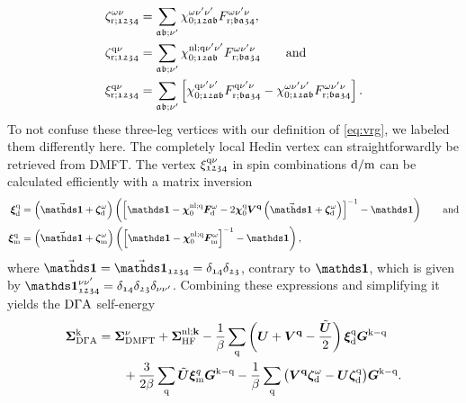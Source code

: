 \documentclass[../../main.tex]{subfiles}
\begin{document}
\begin{align}\label{eq:three_leg_vertices_abinitio_dga}
	\zeta_{\text{r};\mathfrak{1234}}^{\omega\nu}&=\sum_{\mathfrak{ab;\nu'}}\chi_{0;\mathfrak{12ab}}^{\omega\nu'\nu'}F_{\text{r};\mathfrak{ba34}}^{\omega\nu'\nu},\\
	\zeta_{\text{r};\mathfrak{1234}}^{\text{q}\nu}&=\sum_{\mathfrak{ab;\nu'}}\chi_{0;\mathfrak{12ab}}^{\text{nl};\text{q}\nu'\nu'}F_{\text{r};\mathfrak{ba34}}^{\omega\nu'\nu}\qquad\text{and}\\
	\xi_{\text{r};\mathfrak{1234}}^{\text{q}\nu}&=\sum_{\mathfrak{ab;\nu'}}\left [\chi_{0;\mathfrak{12ab}}^{\text{q}\nu'\nu'}F_{\text{r};\mathfrak{ba34}}^{\text{q}\nu'\nu}-\chi_{0;\mathfrak{12ab}}^{\omega\nu'\nu'}F_{\text{r};\mathfrak{ba34}}^{\omega\nu'\nu}\right ].
\end{align}
To not confuse these three-leg vertices with our definition of \eqref{eq:vrg}, we labeled them differently here. The completely local Hedin vertex can straightforwardly be retrieved from DMFT. The vertex $\xi_{\mathfrak{1234}}^{\text{q}\nu}$ in spin combinations $\text{d}/\text{m}$ can be calculated efficiently with a matrix inversion
\begin{subequations}
\begin{align}
	\bm\xi_{\dens}^{\q}&=\left (\vec{\bm\unity}+\bm\zeta_{\dens}^{\omega}\right )\left (\left [\bm\unity-\bm\chi_{0}^{\nl;\q}\bm F_{\dens}^{\omega}-2\bm\chi_{0}^{\q}\bm V^{\vv{q}}\left (\vec{\bm\unity}+\bm\zeta_{\dens}^{\omega}\right )\right ]^{-1}-\bm\unity\right )\qqand\\
	\bm\xi_{\magn}^{\q}&=\left (\vec{\bm\unity}+\bm\zeta_{\magn}^{\omega}\right )\left (\left [\bm\unity-\bm\chi_{0}^{\nl;\q}\bm F_{\magn}^{\omega}\right ]^{-1}-\bm\unity\right ),
\end{align}
\end{subequations}
where $\vec{\bm\unity}=\vec{\bm\unity}_{\mathfrak{1234}}=\delta_{\mathfrak{14}}\delta_{\mathfrak{23}}$, contrary to $\bm\unity$, which is given by $\bm\unity_{\mathfrak{1234}}^{\nu\nu'}=\delta_{\mathfrak{14}}\delta_{\mathfrak{23}}\delta_{\nu\nu'}$. Combining these expressions and simplifying it \cite{Galler2017} yields the $\text{D}\Gamma\text{A}$ self-energy
\begin{align}\label{eq:sde_abinitio_dga}
\begin{split}
	\bm\Sigma_{\text{D}\Gamma\text{A}}^{\text{k}}&=\bm\Sigma_{\text{DMFT}}^{\nu}+\bm\Sigma_{\text{HF}}^{\text{nl};\textbf{k}}-\frac1\beta\sum_{\text{q}}\left (\bm U + \bm V^{\textbf{q}}-\frac{\tilde{\bm U}}{2}\right )\bm\xi_{\text{d}}^{\text{q}}\bm G^{\text{k}-\text{q}}\\
	&\qquad+\frac{3}{2\beta}\sum_{\text{q}}\tilde{\bm U}\bm\xi_{\text{m}}^{q}\bm G^{\text{k}-\text{q}}-\frac1\beta\sum_{\text{q}}\big (\bm V^{\textbf{q}}\bm\zeta_{\text{d}}^{\omega}-\bm U\bm\zeta_{\text{d}}^{\text{q}}\big )\bm G^{\text{k}-\text{q}}.
\end{split}
\end{align}
\end{document}
